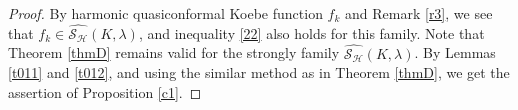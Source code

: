 \documentclass[11pt, reqno]{amsart}
\newtheorem{theorem}{Theorem}
\numberwithin{equation}{section}
\begin{document}
\begin{proof} 
By harmonic quasiconformal Koebe function $f_k$ and Remark \ref{r3}, 
we see that $f_k\in \widehat{\mathcal{S}_\mathcal{H}}(K,\lambda)$, and  
inequality \eqref{22} also holds for this family. Note that Theorem \ref{thmD} remains valid for the strongly family \(\widehat{\mathcal{S}_\mathcal{H}}(K,\lambda)\).
By Lemmas \ref{t011} and \ref{t012}, and using the similar method as in Theorem \ref{thmD},
 we get the assertion of Proposition \ref{c1}.
\end{proof}




\end{document}
